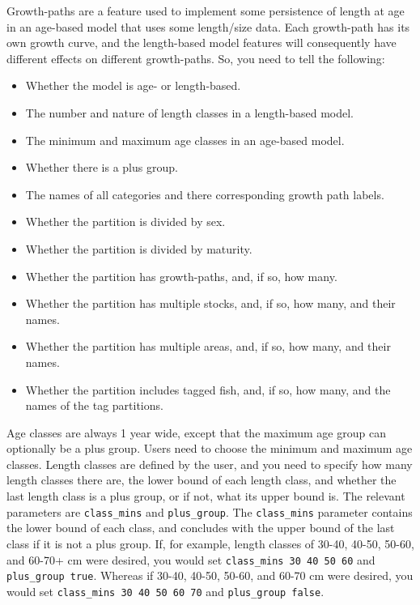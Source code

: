 Growth-paths are a feature used to implement some persistence of length at age in an age-based model that uses some length/size data. Each growth-path has its own growth curve, and the length-based model features will consequently  have different effects on different growth-paths. So, you need to tell \CNAME  the following: 

\begin{itemize}
\item Whether the model is age- or length-based.
\item The number and nature of length classes in a length-based model.
\item	The minimum and maximum age classes in an age-based model.
\item	Whether there is a plus group.
\item 	The names of all categories and there corresponding growth path labels.
\item	Whether the partition is divided by sex.
\item	Whether the partition is divided by maturity.
\item	Whether the partition has growth-paths, and, if so, how many.
\item	Whether the partition has multiple stocks, and, if so, how many, and their names.
\item	Whether the partition has multiple areas, and, if so, how many, and their names.
\item	Whether the partition includes tagged fish, and, if so, how many, and the names of the tag partitions.
\end{itemize}

Age classes are always 1 year wide, except that the maximum age group can optionally be a plus group. Users need to choose the minimum and maximum age classes. Length classes are defined by the user, and you need to specify how many length classes there are, the lower bound of each length class, and whether the last length class is a plus group, or if not, what its upper bound is. The relevant parameters are \texttt{class\_mins} and \texttt{plus\_group}. The \texttt{class\_mins} parameter contains the lower bound of each class, and concludes with the upper bound of the last class if it is not a plus group. If, for example, length classes of 30-40, 40-50, 50-60, and 60-70+ cm were desired, you would set \texttt{class\_mins 30 40 50 60} and \texttt{plus\_group true}. Whereas if 30-40, 40-50, 50-60, and 60-70 cm were desired, you would set \texttt{class\_mins 30 40 50 60 70} and \texttt{plus\_group false}.

